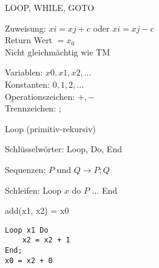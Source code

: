 \begin{minipage}
    {0.62\linewidth}
\begin{concept}{LOOP{,} WHILE{,} GOTO}

        Zuweisung: $xi = xj + c$ oder $xi = xj - c$\\
        Return Wert $= x_0$\\
        Nicht gleichmächtig wie TM
\end{concept}
\end{minipage}
\begin{minipage}{0.34\linewidth}
    {\small
    Variablen: $x0, x1, x2, ...$\\
Konstanten: $0, 1, 2, ...$\\
Operationszeichen: $+, -$\\
Trennzeichen: $;$}
\end{minipage}

\begin{minipage}{0.5\linewidth}
    \begin{KR}{Loop (primitiv-rekursiv)}

            Schlüsselwörter: Loop, Do, End

            Sequenzen: $P$ und $Q \rightarrow P; Q$

            Schleifen: Loop $x$ do $P$ ... End
    \end{KR}
    \end{minipage}
    \begin{minipage}{0.5\linewidth}
    \begin{example} add(x1, x2) = x0

\begin{lstlisting}[style=Pseudocode, aboveskip=-0.05\baselineskip, belowskip=-0.5\baselineskip]
Loop x1 Do
    x2 = x2 + 1
End;
x0 = x2 + 0
\end{lstlisting}
    \end{example}
\end{minipage}

